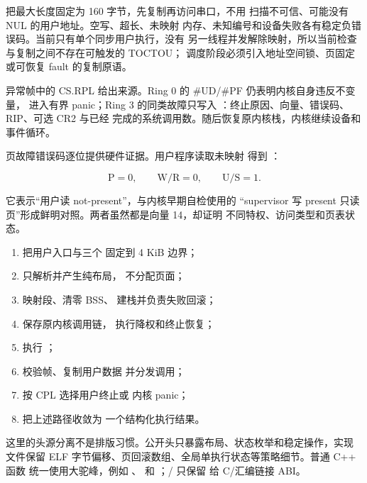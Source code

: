  把最大长度固定为 160 字节，先复制再访问串口，不用
 扫描不可信、可能没有 NUL 的用户地址。空写、超长、未映射
内存、未知编号和设备失败各有稳定负错误码。当前只有单个同步用户执行，没有
另一线程并发解除映射，所以当前检查与复制之间不存在可触发的 TOCTOU；
调度阶段必须引入地址空间锁、页固定或可恢复 fault 的复制原语。

异常帧中的 CS.RPL 给出来源。Ring 0 的 \#UD/\#PF 仍表明内核自身违反不变量，
进入有界 panic；Ring 3 的同类故障只写入
：终止原因、向量、错误码、RIP、可选 CR2 与已经
完成的系统调用数。随后恢复原内核栈，内核继续设备和事件循环。

页故障错误码逐位提供硬件证据。用户程序读取未映射
 得到 ：

\[
  \mathrm{P}=0,\qquad \mathrm{W/R}=0,\qquad \mathrm{U/S}=1.
\]

它表示“用户读 not-present”，与内核早期自检使用的 
“supervisor 写 present 只读页”形成鲜明对照。两者虽然都是向量 14，却证明
不同特权、访问类型和页表状态。

\par
\begin{enumerate}
  \item {} 把用户入口与三个
         固定到 4 KiB 边界；
  \item {} 只解析并产生纯布局，
        不分配页面；
  \item {} 映射段、清零 BSS、
        建栈并负责失败回滚；
  \item {} 保存原内核调用链，
        执行降权和终止恢复；
  \item {} 执行
        ；
  \item {} 校验帧、复制用户数据
        并分发调用；
  \item {} 按 CPL 选择用户终止或
        内核 panic；
  \item {} 把上述路径收敛为
        一个结构化执行结果。
\end{enumerate}

这里的头源分离不是排版习惯。公开头只暴露布局、状态枚举和稳定操作，实现
文件保留 ELF 字节偏移、页回滚数组、全局单执行状态等策略细节。普通 C++ 函数
统一使用大驼峰，例如 、
和 ；/ 只保留
给 C/汇编链接 ABI。

